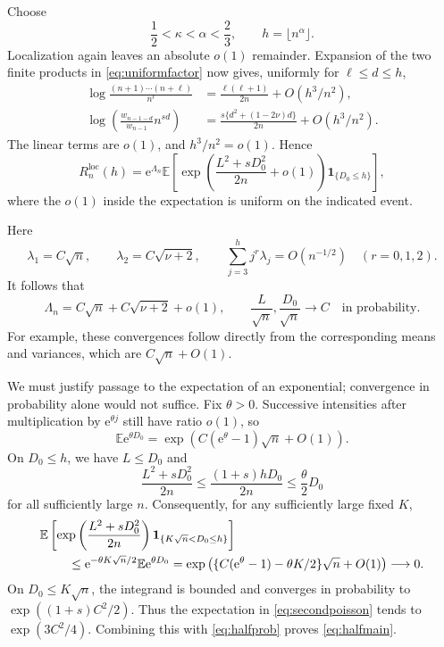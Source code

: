 \documentclass[11pt,a4paper]{article}
\theoremstyle{definition}
\theoremstyle{remark}
\newcommand{\ee}{\mathrm e}
\newcommand{\Exp}{\mathbb E}
\numberwithin{equation}{section}
\begin{document}
Choose
\begin{equation}
 \frac12<\kappa<\alpha<\frac23,\qquad h=\lfloor n^\alpha\rfloor.
 \label{eq:halfcutoff}
\end{equation}
Localization again leaves an absolute $o(1)$ remainder. Expansion of the
two finite products in \eqref{eq:uniformfactor} now gives, uniformly for
$\ell\le d\le h$,
\begin{align}
 \log\frac{(n+1)\cdots(n+\ell)}{n^\ell}
   &=\frac{\ell(\ell+1)}{2n}+O(h^3/n^2),\\
 \log\left(\frac{w_{n-1-d}}{w_{n-1}}n^{sd}\right)
   &=\frac{s\{d^2+(1-2\nu)d\}}{2n}+O(h^3/n^2).
 \label{eq:secondproduct}
\end{align}
The linear terms are $o(1)$, and $h^3/n^2=o(1)$. Hence
\begin{equation}
 R_n^{\mathrm{loc}}(h)
 =\ee^{\Lambda_n}\Exp\left[
   \exp\left(\frac{L^2+sD_0^2}{2n}+o(1)\right)
   \boldsymbol1_{\{D_0\le h\}}\right],
 \label{eq:secondpoisson}
\end{equation}
where the $o(1)$ inside the expectation is uniform on the indicated event.

Here
\begin{equation}
 \lambda_1=C\sqrt n,\qquad \lambda_2=C\sqrt{\nu+2},\qquad
 \sum_{j=3}^h j^r\lambda_j=O(n^{-1/2})\quad(r=0,1,2).
 \label{eq:halfmeans}
\end{equation}
It follows that
\begin{equation}
 \Lambda_n=C\sqrt n+C\sqrt{\nu+2}+o(1),\qquad
 \frac{L}{\sqrt n},\frac{D_0}{\sqrt n}\longrightarrow C
 \quad\text{in probability}.
 \label{eq:halfprob}
\end{equation}
For example, these convergences follow directly from the corresponding
means and variances, which are $C\sqrt n+O(1)$.

We must justify passage to the expectation of an exponential; convergence
in probability alone would not suffice. Fix $\theta>0$. Successive
intensities after multiplication by $\ee^{\theta j}$ still have ratio
$o(1)$, so
\begin{equation}
 \Exp\ee^{\theta D_0}
 =\exp\left(C(\ee^\theta-1)\sqrt n+O(1)\right).
 \label{eq:chernoff}
\end{equation}
On $D_0\le h$, we have $L\le D_0$ and
\[
 \frac{L^2+sD_0^2}{2n}\le\frac{(1+s)hD_0}{2n}
 \le\frac\theta2 D_0
\]
for all sufficiently large $n$. Consequently, for any sufficiently large
fixed $K$,
\begin{align*}
 &\Exp\left[\exp\left(\frac{L^2+sD_0^2}{2n}\right)
          \boldsymbol1_{\{K\sqrt n<D_0\le h\}}\right]\\
 &\hspace{8mm}\le\ee^{-\theta K\sqrt n/2}\Exp\ee^{\theta D_0}
 =\exp\left(\{C(\ee^\theta-1)-\theta K/2\}\sqrt n+O(1)\right)
 \longrightarrow0.
\end{align*}
On $D_0\le K\sqrt n$, the integrand is bounded and converges in
probability to $\exp((1+s)C^2/2)$. Thus the expectation in
\eqref{eq:secondpoisson} tends to $\exp(3C^2/4)$.
Combining this with \eqref{eq:halfprob} proves \eqref{eq:halfmain}.
\end{document}
